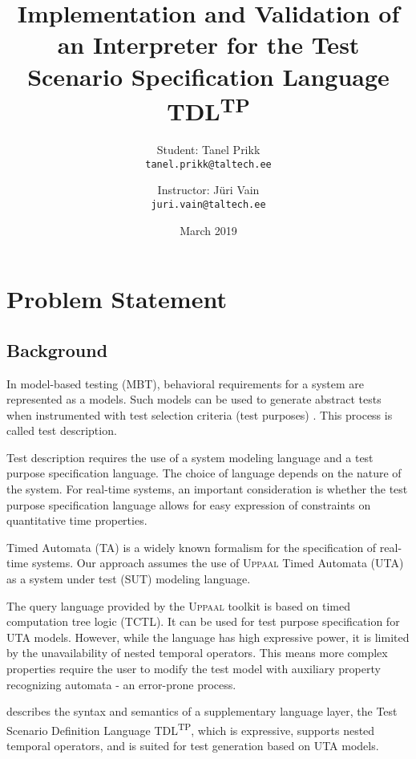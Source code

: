 \documentclass[12pt,oneside,a4paper,draft,notitlepage]{article}
\title{
	Implementation and Validation of an Interpreter
	for the Test Scenario Specification Language TDL\textsuperscript{TP}\\
}
\author{
	Student: Tanel Prikk\\
	\texttt{tanel.prikk@taltech.ee}
	\and
	Instructor: Jüri Vain\\
	\texttt{juri.vain@taltech.ee}
}
\date{March 2019}
\begin{document}
	\maketitle
	\section*{Problem Statement}
	\subsection*{Background}
	\par In model-based testing (MBT), behavioral requirements for a system are represented as a models. Such models can be used to generate abstract tests when instrumented with test selection criteria (test purposes) \cite{etsimbt}. This process is called test description.

	\bigskip

	\par Test description requires the use of a system modeling language and a test purpose specification language. The choice of language depends on the nature of the system. For real-time systems, an important consideration is whether the test purpose specification language allows for easy expression of constraints on quantitative time properties.

	\bigskip

	\par Timed Automata (TA) is a widely known formalism for the specification of real-time systems. Our approach assumes the use of \textsc{Uppaal} Timed Automata (UTA) \cite{uppaaltoolkit} as a system under test (SUT) modeling language.

	\bigskip

	\par The query language provided by the \textsc{Uppaal} toolkit is based on timed computation tree logic (TCTL). It can be used for test purpose specification for UTA models. However, while the language has high expressive power, it is limited by the unavailability of nested temporal operators. This means more complex properties require the user to modify the test model with auxiliary property recognizing automata - an error-prone process.

	\bigskip

	\par \cite{missing} describes the syntax and semantics of a supplementary language layer, the Test Scenario Definition Language TDL\textsuperscript{TP}, which is expressive, supports nested temporal operators, and is suited for test generation based on UTA models.
\end{document}
